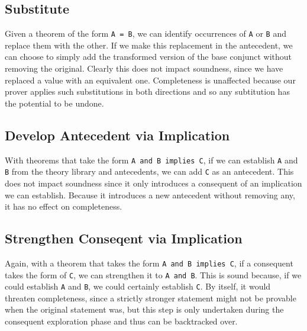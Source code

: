 	\subsection{Substitute}
Given a theorem of the form \texttt{A~=~B}, we can identify occurrences of \texttt{A} or \texttt{B} and replace them with the other.  If we make this replacement in the antecedent, we can choose to simply add the transformed version of the base conjunct without removing the original.  Clearly this does not impact soundness, since we have replaced a value with an equivalent one.  Completeness is unaffected because our prover applies such substitutions in both directions and so any subtitution has the potential to be undone.

	\subsection{Develop Antecedent via Implication}
With theorems that take the form \texttt{A~and~B~implies~C}, if we can establish \texttt{A} and \texttt{B} from the theory library and antecedents, we can add \texttt{C} as an antecedent.  This does not impact soundness since it only introduces a consequent of an implication we can establish.  Because it introduces a new antecedent without removing any, it has no effect on completeness.

	\subsection{Strengthen Conseqent via Implication}
Again, with a theorem that takes the form \texttt{A~and~B~implies~C}, if a consequent takes the form of \texttt{C}, we can strengthen it to \texttt{A~and~B}.  This is sound because, if we could establish \texttt{A} and \texttt{B}, we could certainly establish \texttt{C}.  By itself, it would threaten completeness, since a strictly stronger statement might not be provable when the original statement was, but this step is only undertaken during the consequent exploration phase and thus can be backtracked over.


